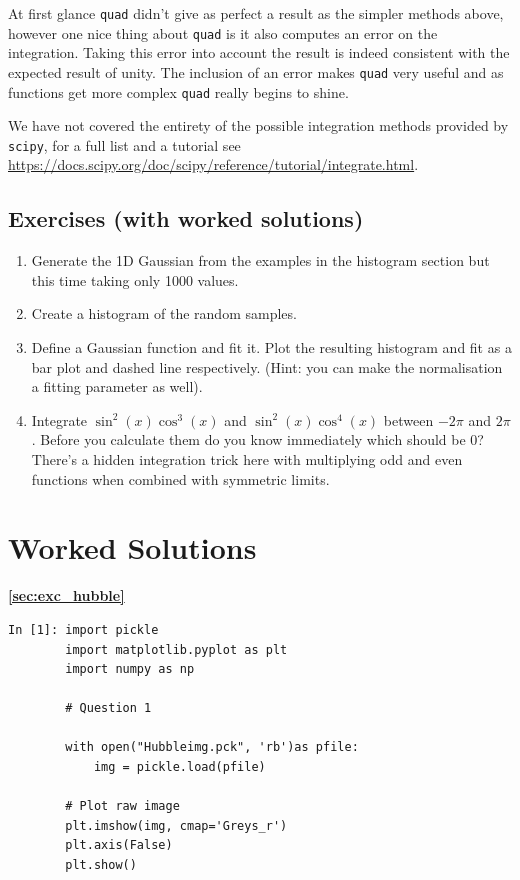 At first glance \texttt{quad} didn't give as perfect a result as the simpler methods above, however one nice thing about \texttt{quad} is it also computes an error on the integration. Taking this error into account the result is indeed consistent with the expected result of unity. The inclusion of an error makes \texttt{quad} very useful and as functions get more complex \texttt{quad} really begins to shine. 

We have not covered the entirety of the possible integration methods provided by \texttt{scipy}, for a full list and a tutorial see \url{https://docs.scipy.org/doc/scipy/reference/tutorial/integrate.html}.

\subsection{Exercises (with worked solutions)} \label{sec:exc_integration}

\begin{enumerate}
\item Generate the 1D Gaussian from the examples in the histogram section but this time taking only 1000 values.
\item Create a histogram of the random samples.
\item Define a Gaussian function and fit it. Plot the resulting histogram and fit as a bar plot and dashed line respectively. (Hint: you can make the normalisation a fitting parameter as well).
\item Integrate $\sin^2(x)\cos^3(x)$ and $\sin^2(x)\cos^4(x)$ between $-2\pi$ and $2\pi$. Before you calculate them do you know immediately which should be 0? There's a hidden integration trick here with multiplying odd and even functions when combined with symmetric limits.
\end{enumerate}

\newpage

\section{Worked Solutions}
\textbf{\ref{sec:exc_hubble}}

\begin{lstlisting}[style=PY]
In [1]: import pickle
        import matplotlib.pyplot as plt
        import numpy as np
        
        # Question 1
        
        with open("Hubbleimg.pck", 'rb')as pfile:
            img = pickle.load(pfile)
        
        # Plot raw image
        plt.imshow(img, cmap='Greys_r')
        plt.axis(False)
        plt.show()
\end{lstlisting}


